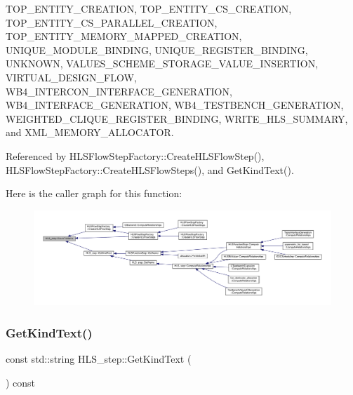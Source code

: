 T\+O\+P\+\_\+\+E\+N\+T\+I\+T\+Y\+\_\+\+C\+R\+E\+A\+T\+I\+ON, T\+O\+P\+\_\+\+E\+N\+T\+I\+T\+Y\+\_\+\+C\+S\+\_\+\+C\+R\+E\+A\+T\+I\+ON, T\+O\+P\+\_\+\+E\+N\+T\+I\+T\+Y\+\_\+\+C\+S\+\_\+\+P\+A\+R\+A\+L\+L\+E\+L\+\_\+\+C\+R\+E\+A\+T\+I\+ON, T\+O\+P\+\_\+\+E\+N\+T\+I\+T\+Y\+\_\+\+M\+E\+M\+O\+R\+Y\+\_\+\+M\+A\+P\+P\+E\+D\+\_\+\+C\+R\+E\+A\+T\+I\+ON, U\+N\+I\+Q\+U\+E\+\_\+\+M\+O\+D\+U\+L\+E\+\_\+\+B\+I\+N\+D\+I\+NG, U\+N\+I\+Q\+U\+E\+\_\+\+R\+E\+G\+I\+S\+T\+E\+R\+\_\+\+B\+I\+N\+D\+I\+NG, U\+N\+K\+N\+O\+WN, V\+A\+L\+U\+E\+S\+\_\+\+S\+C\+H\+E\+M\+E\+\_\+\+S\+T\+O\+R\+A\+G\+E\+\_\+\+V\+A\+L\+U\+E\+\_\+\+I\+N\+S\+E\+R\+T\+I\+ON, V\+I\+R\+T\+U\+A\+L\+\_\+\+D\+E\+S\+I\+G\+N\+\_\+\+F\+L\+OW, W\+B4\+\_\+\+I\+N\+T\+E\+R\+C\+O\+N\+\_\+\+I\+N\+T\+E\+R\+F\+A\+C\+E\+\_\+\+G\+E\+N\+E\+R\+A\+T\+I\+ON, W\+B4\+\_\+\+I\+N\+T\+E\+R\+F\+A\+C\+E\+\_\+\+G\+E\+N\+E\+R\+A\+T\+I\+ON, W\+B4\+\_\+\+T\+E\+S\+T\+B\+E\+N\+C\+H\+\_\+\+G\+E\+N\+E\+R\+A\+T\+I\+ON, W\+E\+I\+G\+H\+T\+E\+D\+\_\+\+C\+L\+I\+Q\+U\+E\+\_\+\+R\+E\+G\+I\+S\+T\+E\+R\+\_\+\+B\+I\+N\+D\+I\+NG, W\+R\+I\+T\+E\+\_\+\+H\+L\+S\+\_\+\+S\+U\+M\+M\+A\+RY, and X\+M\+L\+\_\+\+M\+E\+M\+O\+R\+Y\+\_\+\+A\+L\+L\+O\+C\+A\+T\+OR.



Referenced by H\+L\+S\+Flow\+Step\+Factory\+::\+Create\+H\+L\+S\+Flow\+Step(), H\+L\+S\+Flow\+Step\+Factory\+::\+Create\+H\+L\+S\+Flow\+Steps(), and Get\+Kind\+Text().

Here is the caller graph for this function\+:
\nopagebreak
\begin{figure}[H]
\begin{center}
\leavevmode
\includegraphics[width=350pt]{da/d27/classHLS__step_a4dfb9e61584699f0650b0a38eabbb31f_icgraph}
\end{center}
\end{figure}
\mbox{\label{classHLS__step_a1b5fed780e5f785be6405a8fbeaa093d}} 
\subsubsection{\texorpdfstring{Get\+Kind\+Text()}{GetKindText()}}
{\footnotesize\ttfamily const std\+::string H\+L\+S\+\_\+step\+::\+Get\+Kind\+Text (\begin{DoxyParamCaption}{ }\end{DoxyParamCaption}) const\hspace{0.3cm}{\ttfamily [virtual]}}



